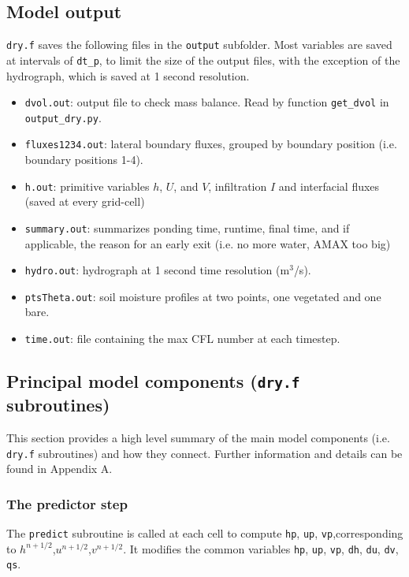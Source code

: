\documentclass{article}
\newcommand{\code}[1]{\texttt{#1}}
\begin{document}
\subsection{Model output}

 \code{dry.f} saves the following  files in the \code{output} subfolder.
Most variables are saved at intervals of  \code{dt\_p}, to limit the size of the output files, with the exception of the hydrograph, which is saved at 1 second resolution.   
\begin{itemize}
	\item \code{dvol.out}:  output file to check mass balance. Read by function \code{get\_dvol} in \code{output\_dry.py}.
	\item \code{fluxes1234.out}: lateral boundary fluxes, grouped by boundary  position (i.e. boundary positions 1-4).  
	\item \code{h.out}: primitive variables $h$, $U$, and $V$, infiltration $I$ and interfacial fluxes (saved at every grid-cell)
	\item \code{summary.out}: summarizes ponding time, runtime, final time, and if applicable, the reason for an early exit (i.e. no more water, AMAX too big) 
	\item \code{hydro.out}: hydrograph at 1 second time resolution (m$^3$/s).  
	\item \code{ptsTheta.out}: soil moisture profiles at two points, one vegetated and one bare. 
	\item \code{time.out}: file containing the max CFL number at each timestep.
\end{itemize}

\subsection{Principal model components (\code{dry.f} subroutines)}

This section provides a high level summary of the main model components (i.e. \code{dry.f} subroutines) and how they connect.  Further information and details can be found in Appendix A.

\subsubsection*{The predictor step}

The \code{predict} subroutine is called at each cell to compute \code{hp}, \code{up},  \code{vp},corresponding to $h^{n+1/2}$,$u^{n+1/2}$,$v^{n+1/2}$.   It modifies the common variables  \code{hp}, \code{up},  \code{vp}, \code{dh}, \code{du}, \code{dv}, \code{qs}.
\end{document}
